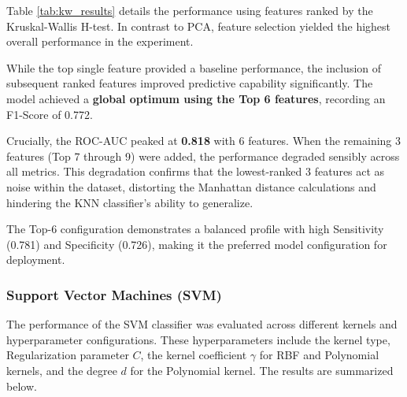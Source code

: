 \documentclass[12pt,a4paper]{article}
\begin{document}
Table \ref{tab:kw_results} details the performance using features ranked by the Kruskal-Wallis H-test. In contrast to PCA, feature selection yielded the highest overall performance in the experiment.

While the top single feature provided a baseline performance, the inclusion of subsequent ranked features improved predictive capability significantly. The model achieved a \textbf{global optimum using the Top 6 features}, recording an F1-Score of 0.772. 

Crucially, the ROC-AUC peaked at \textbf{0.818} with 6 features. When the remaining 3 features (Top 7 through 9) were added, the performance degraded sensibly across all metrics. This degradation confirms that the lowest-ranked 3 features act as noise within the dataset, distorting the Manhattan distance calculations and hindering the KNN classifier's ability to generalize.

The Top-6 configuration demonstrates a balanced profile with high Sensitivity (0.781) and Specificity (0.726), making it the preferred model configuration for deployment.

\begin{table}[htbp]
\centering
{}
\caption{Performance metrics for KNN ($k=5$, Manhattan, Distance) using Kruskal-Wallis feature ranking.}
\label{tab:kw_results}
\end{table}


\subsubsection{Support Vector Machines (SVM)}
The performance of the SVM classifier was evaluated across different kernels and hyperparameter configurations. These hyperparameters include the kernel type, Regularization parameter $C$, the kernel coefficient $\gamma$ for RBF and Polynomial kernels, and the degree $d$ for the Polynomial kernel. The results are summarized below.
\end{document}
